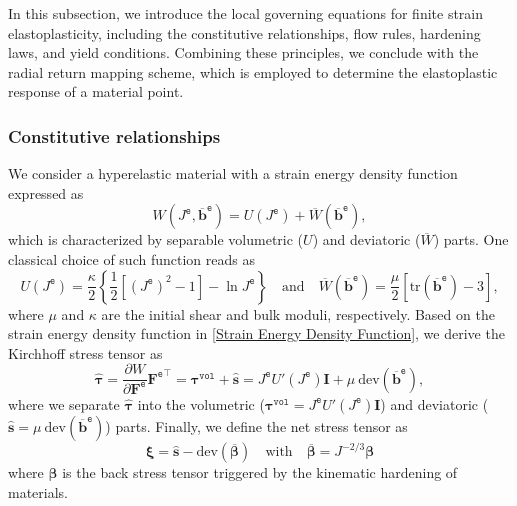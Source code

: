 \documentclass[preprint,11pt]{elsarticle}
\theoremstyle{definition}
\begin{document}
In this subsection, we introduce the local governing equations for finite strain elastoplasticity, including the constitutive relationships, flow rules, hardening laws, and yield conditions. Combining these principles, we conclude with the radial return mapping scheme, which is employed to determine the elastoplastic response of a material point.

\subsubsection{Constitutive relationships}

We consider a hyperelastic material with a strain energy density function expressed as
\begin{equation} \label{Strain Energy Density Function}
    W(J^\texttt{e}, \overline{\mathbf{b}}^\texttt{e}) = U(J^\texttt{e}) + \overline{W}(\overline{\mathbf{b}}^\texttt{e}),
\end{equation}
which is characterized by separable volumetric ($U$) and deviatoric ($\overline{W}$) parts. One classical choice of such function reads as \citep{simo_computational_2006}
\begin{equation} \label{Volumetric and Deviatoric Engery}
    U(J^\texttt{e}) = \dfrac{\kappa}{2} \left\{ \frac{1}{2}\left[(J^\texttt{e})^2-1\right] - \ln J^\texttt{e} \right\}
    \quad \text{and} \quad
    \overline{W}(\overline{\mathbf{b}}^\texttt{e})
    = \dfrac{\mu}{2} \left[ \text{tr}(\overline{\mathbf{b}}^\texttt{e}) - 3 \right],
\end{equation}
where $\mu$ and $\kappa$ are the initial shear and bulk moduli, respectively. Based on the strain energy density function in \eqref{Strain Energy Density Function}, we derive the Kirchhoff stress tensor as
\begin{equation} \label{Kirchhoff Stress}
    \widehat{\boldsymbol{\tau}} = \dfrac{\partial W}{\partial \mathbf{F}^\texttt{e}} {\mathbf{F}^\texttt{e}}^\top
    = \boldsymbol{\tau}^\texttt{vol} + \widehat{\mathbf{s}}
    = J^\texttt{e} U'(J^\texttt{e}) \mathbf{I} + \mu\ \text{dev} (\overline{\mathbf{b}}^\texttt{e}),
\end{equation}
where we separate $\widehat{\boldsymbol{\tau}}$ into the volumetric ($\boldsymbol{\tau}^\texttt{vol} = J^\texttt{e} U'(J^\texttt{e}) \mathbf{I}$) and deviatoric ($\widehat{\mathbf{s}} = \mu\ \text{dev} (\overline{\mathbf{b}}^\texttt{e})$) parts. Finally, we define the net stress tensor as
\begin{equation*}
    \boldsymbol{\xi} = \widehat{\mathbf{s}} - \text{dev}(\overline{\boldsymbol{\beta}})
    \quad \text{with} \quad
    \overline{\boldsymbol{\beta}} = J^{-2/3} \boldsymbol{\beta}
\end{equation*}
where $\boldsymbol{\beta}$ is the back stress tensor triggered by the kinematic hardening of materials.
\end{document}
